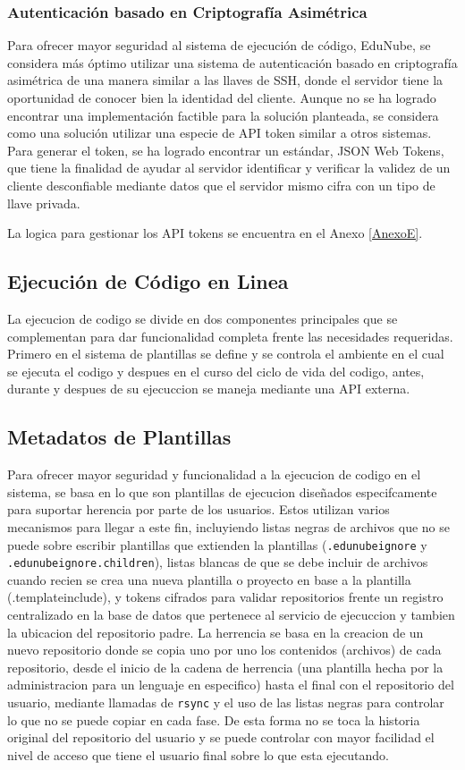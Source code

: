 \subsubsection{Autenticación basado en Criptografía Asimétrica}
Para ofrecer mayor seguridad al sistema de ejecución de código, EduNube, se considera más óptimo utilizar una sistema de autenticación basado en criptografía asimétrica de una manera similar a las llaves de SSH, donde el servidor tiene la oportunidad de conocer bien la identidad del cliente. Aunque no se ha logrado encontrar una implementación factible para la solución planteada, se considera como una solución utilizar una especie de API token similar a otros sistemas. Para generar el token, se ha logrado encontrar un estándar, JSON Web Tokens, que tiene la finalidad de ayudar al servidor identificar y verificar la validez de un cliente desconfiable mediante datos que el servidor mismo cifra con un tipo de llave privada.

La logica para gestionar los API tokens se encuentra en el Anexo \ref{AnexoE}.

\subsection{Ejecución de Código en Linea}
La ejecucion de codigo se divide en dos componentes principales que se complementan para dar funcionalidad completa frente las necesidades requeridas. Primero en el sistema de plantillas se define y se controla el ambiente en el cual se ejecuta el codigo y despues en el curso del ciclo de vida del codigo, antes, durante y despues de su ejecuccion se maneja mediante una API externa.

\subsection{Metadatos de Plantillas}
Para ofrecer mayor seguridad y funcionalidad a la ejecucion de codigo en el sistema, se basa en lo que son plantillas de ejecucion diseñados especifcamente para suportar herencia por parte de los usuarios. Estos utilizan varios mecanismos para llegar a este fin, incluyiendo listas negras de archivos que no se puede sobre escribir plantillas que extienden la plantillas (\texttt{.edunubeignore} y\\ \texttt{.edunubeignore.children}), listas blancas de que se debe incluir de archivos cuando recien se crea una nueva plantilla o proyecto en base a la plantilla (.templateinclude), y tokens cifrados para validar repositorios frente un registro centralizado en la base de datos que pertenece al servicio de ejecuccion y tambien la ubicacion del repositorio padre. La herrencia se basa en la creacion de un nuevo repositorio donde se copia uno por uno los contenidos (archivos) de cada repositorio, desde el inicio de la cadena de herrencia (una plantilla hecha por la administracion para un lenguaje en especifico) hasta el final con el repositorio del usuario, mediante llamadas de \texttt{rsync} y el uso de las listas negras para controlar lo que no se puede copiar en cada fase. De esta forma no se toca la historia original del repositorio del usuario y se puede controlar con mayor facilidad el nivel de acceso que tiene el usuario final sobre lo que esta ejecutando. 
